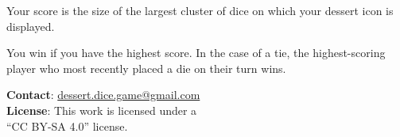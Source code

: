 \documentclass[a6paper, 11pt, parskip=half, DIV=15]{scrartcl}
\begin{document}
Your score is the size of the largest cluster of dice on which your dessert icon is displayed.

You win if you have the highest score. In the case of a tie, the highest-scoring player who most recently placed a die on their turn wins.

\vfill
\hrulefill

\textbf{Contact}: \href{mailto:dessert.dice.game@gmail.com}{dessert.dice.game@gmail.com}\\
\textbf{License}: This work is licensed under a\\``CC BY-SA 4.0'' license.%
 \newpage
\phantom{Dessert Dice}
\end{document}
